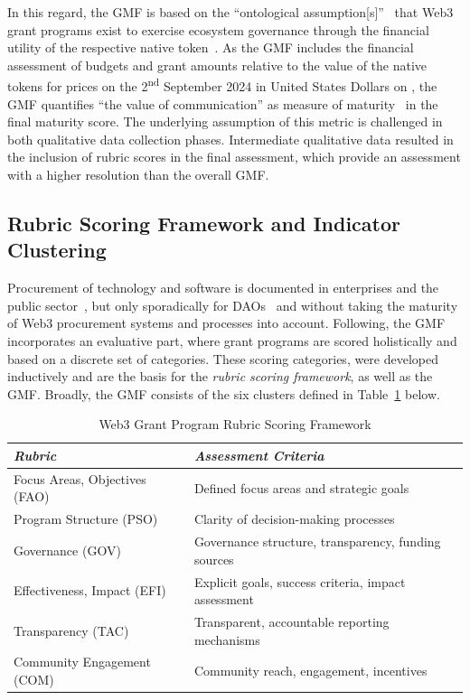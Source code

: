 \documentclass[conference]{IEEEtran}
\begin{document}
In this regard, the GMF is based on the ``ontological assumption[s]''~\cite[pp.~94]{mukumbang_retroductive_2023} that Web3 grant programs exist to exercise ecosystem governance through the financial utility of the respective native token~\cite{beck_governance_2018,messias_understanding_2024}. As the GMF includes the financial assessment of budgets and grant amounts relative to the value of the native tokens for prices on the 2\textsuperscript{nd} September 2024 in United States Dollars on \cite{coinnarketcap_cryptocurrency_2024}, the GMF quantifies ``the value of communication'' as measure of maturity~\cite{johansson_roadmap_2019} in the final maturity score. The underlying assumption of this metric is challenged in both qualitative data collection phases. Intermediate qualitative data resulted in the inclusion of rubric scores in the final assessment, which provide an assessment with a higher resolution than the overall GMF.

\subsection{Rubric Scoring Framework and Indicator Clustering}\label{sec_3.1}

Procurement of technology and software is documented in enterprises and the public sector~\cite{bartle_review_2003,johansson_roadmap_2019,uyarra_barriers_2014}, but only sporadically for DAOs~\cite{monteiro_decentralised_2023} and without taking the maturity of Web3 procurement systems and processes into account. Following, the GMF incorporates an evaluative part, where grant programs are scored holistically and based on a discrete set of categories. These scoring categories, were developed inductively and are the basis for the \textit{rubric scoring framework}, as well as the GMF. Broadly, the GMF consists of the six clusters defined in Table~\ref{tab:grant_rubric} below.

\begin{table}[htbp]
\caption{Web3 Grant Program Rubric Scoring Framework}
\centering
\footnotesize
\begin{tabular}{p{3.8cm}p{4.5cm}}
\hline
\textbf{\textit{Rubric}} & \textbf{\textit{Assessment Criteria}} \\
\hline
Focus Areas, Objectives (FAO) & Defined focus areas and strategic goals \\
\hline
Program Structure (PSO) & Clarity of decision-making processes \\
\hline
Governance (GOV) & Governance structure, transparency, funding sources \\
\hline
Effectiveness, Impact (EFI) & Explicit goals, success criteria, impact assessment \\
\hline
Transparency (TAC) & Transparent, accountable reporting mechanisms \\
\hline
Community Engagement (COM) & Community reach, engagement, incentives \\
\hline
\end{tabular}
\label{tab:grant_rubric}
\end{table}
\end{document}
